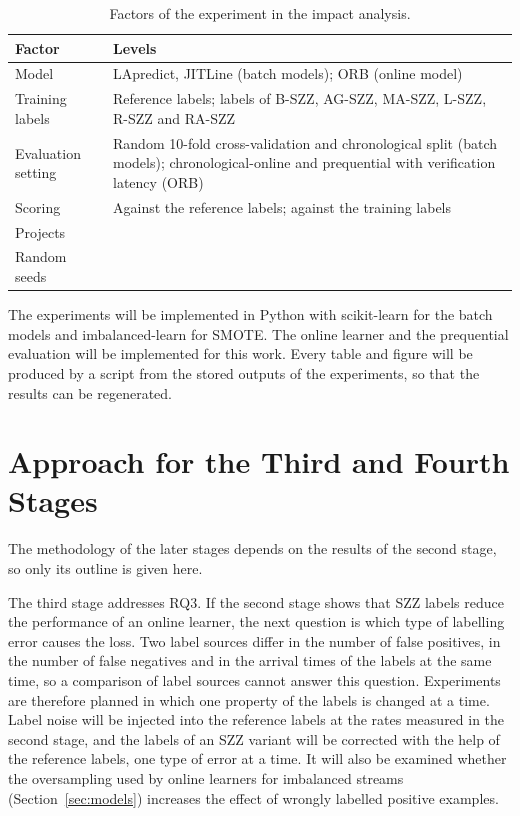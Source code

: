 \documentclass[12pt,a4paper,oneside]{report}
\begin{document}
\begin{table}[htbp]
\centering\small
\caption{Factors of the experiment in the impact analysis.}
\label{tab:design}
\begin{tabularx}{\linewidth}{@{}l>{\raggedright\arraybackslash}X@{}}
\toprule
Factor & Levels \\
\midrule
Model & LApredict, JITLine (batch models); ORB (online model) \\
Training labels & Reference labels; labels of B-SZZ, AG-SZZ, MA-SZZ, L-SZZ,
R-SZZ and RA-SZZ \\
Evaluation setting & Random 10-fold cross-validation and chronological split
(batch models); chronological-online and prequential with verification
latency (ORB) \\
Scoring & Against the reference labels; against the training labels \\
Projects & 21 \\
Random seeds & 10 \\
\bottomrule
\end{tabularx}
\end{table}

The experiments will be implemented in Python with scikit-learn for the batch
models and imbalanced-learn for SMOTE. The online learner and the prequential
evaluation will be implemented for this work. Every table and figure will be
produced by a script from the stored outputs of the experiments, so that the
results can be regenerated.

\section{Approach for the Third and Fourth Stages}\label{sec:later}

The methodology of the later stages depends on the results of the second
stage, so only its outline is given here.

The third stage addresses RQ3. If the second stage shows that SZZ labels
reduce the performance of an online learner, the next question is which type
of labelling error causes the loss. Two label sources differ in the number of
false positives, in the number of false negatives and in the arrival times of
the labels at the same time, so a comparison of label sources cannot answer
this question. Experiments are therefore planned in which one property of the
labels is changed at a time. Label noise will be injected into the reference
labels at the rates measured in the second stage, and the labels of an SZZ
variant will be corrected with the help of the reference labels, one type of
error at a time. It will also be examined whether the oversampling used by
online learners for imbalanced streams (Section~\ref{sec:models}) increases
the effect of wrongly labelled positive examples.
\end{document}
